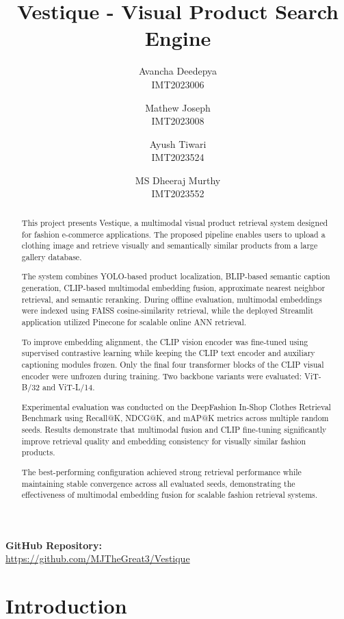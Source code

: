 \documentclass[11pt,a4paper]{article}
\title{\textbf{Vestique - Visual Product Search Engine}\\
\vspace{0.5cm}}
\author{
    Avancha Deedepya \\
    IMT2023006 \\
    \and
    Mathew Joseph \\
    IMT2023008 \\
    \and
    Ayush Tiwari \\
    IMT2023524 \\
    \and
    MS Dheeraj Murthy \\
    IMT2023552\\
}
\date{}
\begin{document}
\maketitle

\begin{center}
\textbf{GitHub Repository:} \\
\url{https://github.com/MJTheGreat3/Vestique}
\end{center}

\begin{abstract}

\small{
This project presents Vestique, a multimodal visual product retrieval system designed for fashion e-commerce applications. The proposed pipeline enables users to upload a clothing image and retrieve visually and semantically similar products from a large gallery database.

The system combines YOLO-based product localization, BLIP-based semantic caption generation, CLIP-based multimodal embedding fusion, approximate nearest neighbor retrieval, and semantic reranking. During offline evaluation, multimodal embeddings were indexed using FAISS cosine-similarity retrieval, while the deployed Streamlit application utilized Pinecone for scalable online ANN retrieval.

To improve embedding alignment, the CLIP vision encoder was fine-tuned using supervised contrastive learning while keeping the CLIP text encoder and auxiliary captioning modules frozen. Only the final four transformer blocks of the CLIP visual encoder were unfrozen during training. Two backbone variants were evaluated: ViT-B/32 and ViT-L/14.

Experimental evaluation was conducted on the DeepFashion In-Shop Clothes Retrieval Benchmark using Recall@K, NDCG@K, and mAP@K metrics across multiple random seeds. Results demonstrate that multimodal fusion and CLIP fine-tuning significantly improve retrieval quality and embedding consistency for visually similar fashion products.

The best-performing configuration achieved strong retrieval performance while maintaining stable convergence across all evaluated seeds, demonstrating the effectiveness of multimodal embedding fusion for scalable fashion retrieval systems.
}

\end{abstract}
\newpage
\tableofcontents
\newpage


\section{Introduction}
\end{document}
